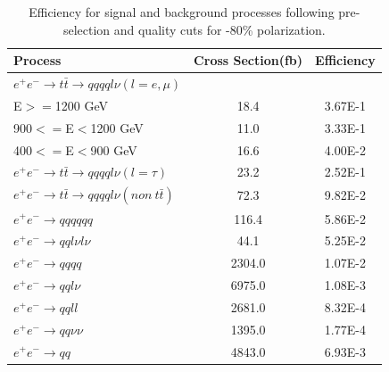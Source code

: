 \begin{table}
  \centering
  \begin{tabular}{l | c | c }
    \toprule
    Process     & Cross Section(fb) & Efficiency  \\
    \midrule
    $e^+e^-\rightarrow t\bar{t} \rightarrow qqqql\nu (l=e,\mu)$&  &  \\
    E$>=$1200 GeV & 18.4 & 3.67E-1 \\
    900$<=$E$<$1200 GeV & 11.0 & 3.33E-1 \\
    400$<=$E$<$900 GeV & 16.6 & 4.00E-2 \\
    \midrule
    $e^+e^-\rightarrow t\bar{t} \rightarrow qqqql\nu (l=\tau)$& 23.2 & 2.52E-1 \\
    \midrule
    $e^+e^-\rightarrow t\bar{t} \rightarrow qqqql\nu (non ~ t\bar{t})$& 72.3 & 9.82E-2\\
    \midrule
    $e^+e^-\rightarrow qqqqqq$ & 116.4 & 5.86E-2  \\
    \midrule
    $e^+e^-\rightarrow qql\nu l\nu$ & 44.1 & 5.25E-2 \\
    \midrule
    $e^+e^-\rightarrow qqqq$ & 2304.0 & 1.07E-2 \\
    \midrule
    $e^+e^-\rightarrow qql\nu$ & 6975.0 & 1.08E-3 \\
    \midrule
    $e^+e^-\rightarrow qqll$ & 2681.0 & 8.32E-4 \\
    \midrule
    $e^+e^-\rightarrow qq\nu\nu$ & 1395.0 & 1.77E-4 \\
    \midrule
    $e^+e^-\rightarrow qq$ & 4843.0 & 6.93E-3\\
    \bottomrule
  \end{tabular}
  \caption{Efficiency for signal and background processes following pre-selection and quality cuts for -80\% polarization.}
  \label{table:topqualneg}
\end{table}

